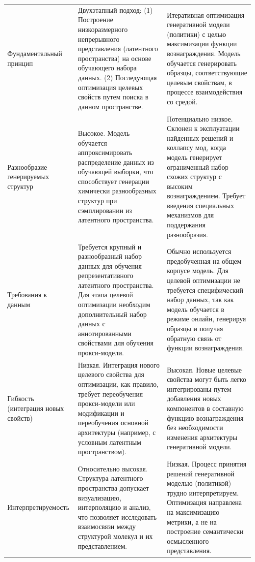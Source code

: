 \begin{longtable}{|p{40mm}|>{\RaggedRight}X|>{\RaggedRight}X|}
Фундаментальный принцип & Двухэтапный подход: (1) Построение низкоразмерного непрерывного представления (латентного пространства) на основе обучающего набора данных. (2) Последующая оптимизация целевых свойств путем поиска в данном пространстве. & Итеративная оптимизация генеративной модели (политики) с целью максимизации функции вознаграждения. Модель обучается генерировать образцы, соответствующие целевым свойствам, в процессе взаимодействия со средой. \\
\addlinespace
\hline
Разнообразие генерируемых структур & Высокое. Модель обучается аппроксимировать распределение данных из обучающей выборки, что способствует генерации химически разнообразных структур при сэмплировании из латентного пространства. & Потенциально низкое. Склонен к эксплуатации найденных решений и коллапсу мод, когда модель генерирует ограниченный набор схожих структур с высоким вознаграждением. Требует введения специальных механизмов для поддержания разнообразия. \\
\addlinespace
\hline
Требования к данным & Требуется крупный и разнообразный набор данных для обучения репрезентативного латентного пространства. Для этапа целевой оптимизации необходим дополнительный набор данных с аннотированными свойствами для обучения прокси-модели. & Обычно используется предобученная на общем корпусе модель. Для целевой оптимизации не требуется специфический набор данных, так как модель обучается в режиме онлайн, генерируя образцы и получая обратную связь от функции вознаграждения. \\
\addlinespace
\hline
Гибкость (интеграция новых свойств) & Низкая. Интеграция нового целевого свойства для оптимизации, как правило, требует переобучения прокси-модели или модификации и переобучения основной архитектуры (например, с условным латентным пространством). & Высокая. Новые целевые свойства могут быть легко интегрированы путем добавления новых компонентов в составную функцию вознаграждения без необходимости изменения архитектуры генеративной модели. \\
\addlinespace
\hline
Интерпретируемость & Относительно высокая. Структура латентного пространства допускает визуализацию, интерполяцию и анализ, что позволяет исследовать взаимосвязи между структурой молекул и их представлением. & Низкая. Процесс принятия решений генеративной моделью (политикой) трудно интерпретируем. Оптимизация направлена на максимизацию метрики, а не на построение семантически осмысленного представления. \hline



\end{longtable}
